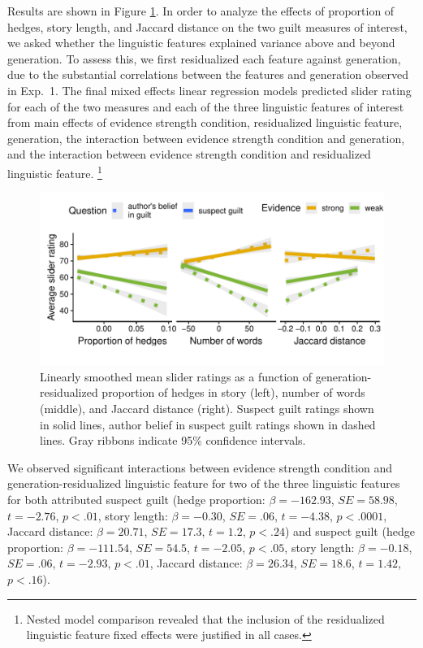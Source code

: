 \documentclass[10pt,letterpaper]{article}
\begin{document}
Results are shown in Figure \ref{fig:lingmarkers}. In order to analyze the effects of proportion of hedges, story length, and Jaccard distance on the two guilt measures of interest, we asked whether the linguistic features explained variance above and beyond generation. To assess this, we first residualized each feature against generation, due to the substantial correlations between the features and generation observed in Exp.~1. The final mixed effects linear regression models predicted slider rating for each of the two measures and each of the three linguistic features of interest from main effects of evidence strength condition, residualized linguistic feature, generation, the interaction between evidence strength condition and generation, and the interaction between evidence strength condition and residualized linguistic feature. \footnote{Nested model comparison revealed that the inclusion of the residualized linguistic feature fixed effects were justified in all cases.}

\begin{figure}[]
	\includegraphics[width=.5\textwidth]{pics/lingmarkers_resid}
	\caption{Linearly smoothed mean slider ratings as a function of generation-residualized proportion of hedges in story (left), number of words (middle), and Jaccard distance (right). Suspect guilt ratings shown in solid lines, author belief in suspect guilt ratings shown in dashed lines. Gray ribbons indicate 95\% confidence intervals.} 
	\label{fig:lingmarkers}
\end{figure}

We observed significant interactions between evidence strength condition and generation-residualized linguistic feature for two of the three linguistic features for both attributed suspect guilt (hedge proportion: $\beta = -162.93$, $SE = 58.98$, $t = -2.76$, $p < .01$, story length: $\beta = -0.30$, $SE = .06$, $t = -4.38$, $p < .0001$, Jaccard distance: $\beta = 20.71$, $SE = 17.3$, $t = 1.2$, $p < .24$) and suspect guilt (hedge proportion: $\beta = -111.54$, $SE = 54.5$, $t = -2.05$, $p < .05$, story length: $\beta = -0.18$, $SE = .06$, $t = -2.93$, $p < .01$, Jaccard distance: $\beta = 26.34$, $SE = 18.6$, $t = 1.42$, $p < .16$). 
\end{document}
